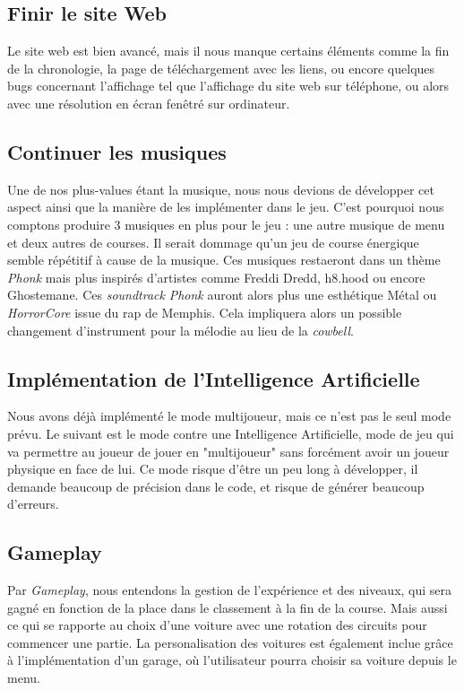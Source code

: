 \documentclass[12pt,a4paper]{article}
\newcommand{\AI}{Intelligence Artificielle}
\begin{document}
    \subsection{Finir le site Web}
        Le site web est bien avancé, mais il nous manque certains éléments 
        comme la fin de la chronologie, la page de téléchargement avec les liens,
        ou encore quelques bugs concernant l'affichage tel que l'affichage du
        site web sur téléphone, ou alors avec une résolution en écran fenêtré sur ordinateur.
        
    \subsection{Continuer les musiques}
        Une de nos plus-values étant la musique, nous nous devions de développer cet aspect
        ainsi que la manière de les implémenter dans le jeu. C'est pourquoi nous comptons
        produire 3 musiques en plus pour le jeu : une autre musique de menu et deux autres
        de courses. Il serait dommage qu'un jeu de course énergique semble répétitif à cause
        de la musique. Ces musiques restaeront dans un thème \textsl{Phonk} mais plus inspirés d'artistes
        comme Freddi Dredd, h8.hood ou encore Ghostemane. Ces \textit{soundtrack} \textit{Phonk} auront alors plus
        une esthétique Métal ou \textit{HorrorCore} issue du rap de Memphis. Cela impliquera alors 
        un possible changement d'instrument pour la mélodie au lieu de la \textit{cowbell}.
        
    \subsection{Implémentation de l'\AI}
        Nous avons déjà implémenté le mode multijoueur, mais ce n'est pas le seul mode prévu.
        Le suivant est le mode contre une \AI, mode de jeu qui va permettre au joueur de jouer
        en "multijoueur" sans forcément avoir un joueur physique en face de lui. Ce mode risque
        d'être un peu long à développer, il demande beaucoup de précision dans le code, et risque
        de générer beaucoup d'erreurs.

    \subsection{Gameplay}
        Par \textit{Gameplay}, nous entendons la gestion de l'expérience et des niveaux,
        qui sera gagné en fonction de la place dans le classement à la fin de la course.
        Mais aussi ce qui se rapporte au choix d'une voiture avec une rotation des circuits pour
        commencer une partie. La personalisation des voitures est également inclue grâce à 
        l'implémentation d'un garage, où l'utilisateur pourra choisir sa voiture depuis le menu.
\end{document}
